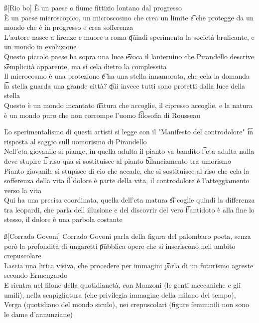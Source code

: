 \documentclass[12pt]{article}
\begin{document}
\ss[Rio bo]
È un paese o fiume fittizio lontano dal progresso \\
È un paese microscopico, un microscosmo che crea un limite \t e che protegge da un mondo che è in progresso e crea sofferenza \\
L'autore nasce a firenze e muore a roma \t quindi sperimenta la società brulicante, e un mondo in evoluzione \\
Questo piccolo paese ha sopra una luce \t evoca il lanternino che Pirandello descrive \t semplicità apparente, ma si cela dietro la complessita \\
Il microcosmo è una protezione \t e ha una stella innamorata, che cela la domanda \t la stella guarda una grande città? \t qui invece tutti sono protetti dalla luce della stella \\
Questo è un mondo incantato \t natura che accoglie, il cipresso accoglie, e la natura è un mondo puro che non corrompe l'uomo \t filosofia di Rousseau

\v

Lo sperimentalismo di questi artisti si legge con il "Manifesto del controdolore" \t in risposta al saggio sull uomorismo di Pirandello \\
Nell'eta giovanile si piange, in quella adulta il pianto va bandito \t l'eta adulta nulla deve stupire \t il riso qua si sostituisce al pianto \t bilanciamento tra umorismo \\
Pianto giovanile si stupisce di cio che accade, che si sostituisce al riso che cela la sofferenza della vita \t il dolore è parte della vita, il controdolore è l'atteggiamento verso la vita \\
Qui ha una precisa coordinata, quella dell'eta matura \t si coglie quindi la differenza tra leopardi, che parla dell illusione e del discovrir del vero \t l'antidoto è alla fine lo stesso, il dolore è una parbola costante

\ss[Corrado Govoni]
Corrado Govoni parla della figura del palombaro poeta, senza però la profondità di ungaretti \t pubblica opere che si inseriscono nell ambito crepuscolare \\
Lascia una lirica visiva, che procedere per immagini \t parla di un futurismo agreste secondo Ermengardo \\
E rientra nel filone della quotidianetà, con Manzoni (le genti meccaniche e gli umili), nella scapigliatura (che privilegia immagine della milano del tempo), Verga (quotidiano del mondo siculo), nei crepuscolari (figure femminili non sono le dame d'annunziane)
\end{document}
